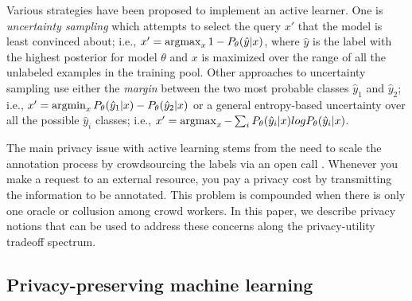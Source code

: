 \documentclass[letterpaper]{article}
\newcommand{\argmin}{\operatornamewithlimits{argmin}}
\newcommand{\argmax}{\operatornamewithlimits{argmax}}
\begin{document}
Various strategies have been proposed to implement an active learner. One is \textit{uncertainty sampling} \cite{lewis1994sequential} which attempts to select the query $x'$ that the model is least convinced about;  i.e., \begin{math} x' = \argmax_x 1 - P_\theta(\hat{y}|x) \end{math}, where \begin{math}\hat{y}\end{math} is the label with the highest posterior for model \begin{math} \theta \end{math} and $x$ is maximized over the range of all the unlabeled examples in the training pool. Other approaches to uncertainty sampling use either the \textit{margin} between the two most probable classes \begin{math}\hat{y}_1\end{math} and \begin{math}\hat{y}_2\end{math}; i.e., \begin{math} x' = \argmin_x P_\theta(\hat{y}_1|x) - P_\theta(\hat{y}_2|x)\end{math} or a general entropy-based uncertainty over all the possible \begin{math}\hat{y}_i\end{math} classes; i.e., \begin{math} x' = \argmax_x - \sum_i P_\theta(\hat{y}_i|x) log P_\theta(\hat{y}_i|x) \end{math}.

The main privacy issue with active learning stems from the need to scale the annotation process by crowdsourcing the labels via an open call \cite{howe2006rise}. Whenever you make a request to an external resource, you pay a privacy cost by transmitting the information to be annotated. This problem is compounded when there is only one oracle \cite{avidan2007efficient} or collusion among crowd workers. In this paper, we describe privacy notions that can be used to address these concerns along the privacy-utility tradeoff spectrum.

\subsection{Privacy-preserving machine learning}
\end{document}
